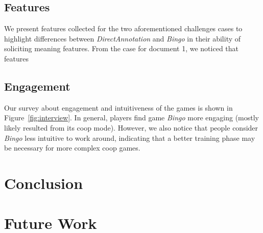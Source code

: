 \documentclass[chi_draft]{sigchi}
\begin{document}
\subsection{Features}

We present features collected for the two aforementioned challenges cases to highlight differences between \emph{DirectAnnotation} and \emph{Bingo} in their ability of soliciting meaning features. From the case for document 1, we noticed that features

\subsection{Engagement}
 Our survey about engagement and intuitiveness of the games is shown in Figure~\ref{fig:interview}. In general, players find game \emph{Bingo} more engaging (mostly likely resulted from its coop mode). However, we also notice that people consider \emph{Bingo} less intuitive to work around, indicating that a better training phase may be necessary for more complex coop games.

\section{Conclusion}

\section{Future Work}


%
%
%
%
%



\end{document}
